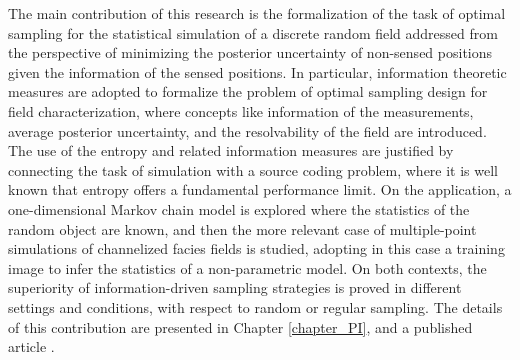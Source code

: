 The main contribution of this research is the formalization of the task of optimal %
sampling for the statistical simulation of a discrete random field addressed from the perspective of minimizing the posterior uncertainty of non-sensed positions given the information of the sensed positions. In particular, information theoretic measures are adopted to formalize the problem of optimal sampling design for field characterization,  where concepts like information of the measurements, average posterior uncertainty, and the  resolvability of the field are introduced. The use of the entropy and related information measures are justified by connecting the task of simulation with a source coding problem,  where it is well known that entropy offers a fundamental performance limit.
On the application, a one-dimensional Markov chain model is explored where the statistics of the random object are known, and then the more relevant case of multiple-point simulations of channelized facies fields is studied, adopting in this case a training image to infer the statistics of a non-parametric model.  On both contexts, the superiority of  information-driven %
sampling strategies is proved in different settings and conditions, with respect to random or regular sampling. The details of this contribution are presented in Chapter \ref{chapter_PI}, and a published article \citep{Santibanez2019_a}.

